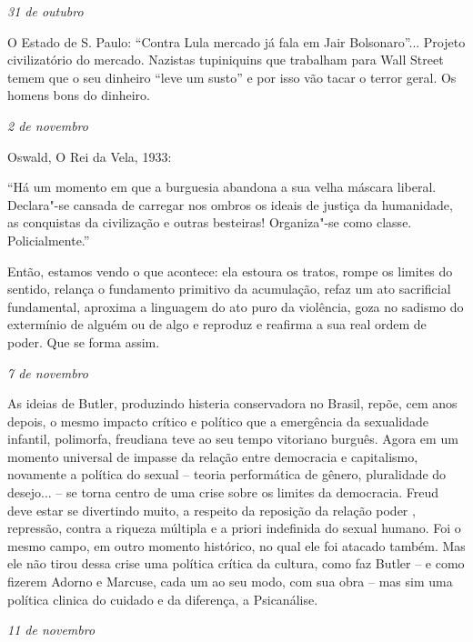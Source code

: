 \begin{flushright}
\emph{31 de outubro}
\end{flushright}

O Estado de S. Paulo: ``Contra Lula mercado já fala em Jair
Bolsonaro''... Projeto civilizatório do mercado. Nazistas tupiniquins
que trabalham para Wall Street temem que o seu dinheiro ``leve um
susto'' e por isso vão tacar o terror geral. Os homens bons do dinheiro.

\pagebreak

\begin{flushright}
\emph{2 de novembro}
\end{flushright}

Oswald, O Rei da Vela, 1933:

``Há um momento em que a burguesia abandona a sua velha máscara liberal.
Declara"-se cansada de carregar nos ombros os ideais de justiça da
humanidade, as conquistas da civilização e outras besteiras! Organiza"-se
como classe. Policialmente.''

Então, estamos vendo o que acontece: ela estoura os tratos, rompe os
limites do sentido, relança o fundamento primitivo da acumulação, refaz
um ato sacrificial fundamental, aproxima a linguagem do ato puro da
violência, goza no sadismo do extermínio de alguém ou de algo e reproduz
e reafirma a sua real ordem de poder. Que se forma assim.

\begin{flushright}
\emph{7 de novembro}
\end{flushright}

As ideias de Butler, produzindo histeria conservadora no Brasil, repõe,
cem anos depois, o mesmo impacto crítico e político que a emergência da
sexualidade infantil, polimorfa, freudiana teve ao seu tempo vitoriano
burguês. Agora em um momento universal de impasse da relação entre
democracia e capitalismo, novamente a política do sexual -- teoria
performática de gênero, pluralidade do desejo... -- se torna centro de
uma crise sobre os limites da democracia. Freud deve estar se divertindo
muito, a respeito da reposição da relação poder , repressão, contra a
riqueza múltipla e a priori indefinida do sexual humano. Foi o mesmo
campo, em outro momento histórico, no qual ele foi atacado também. Mas
ele não tirou dessa crise uma política crítica da cultura, como faz
Butler -- e como fizerem Adorno e Marcuse, cada um ao seu modo, com sua
obra -- mas sim uma política clinica do cuidado e da diferença, a
Psicanálise.

\begin{flushright}
\emph{11 de novembro}
\end{flushright}

